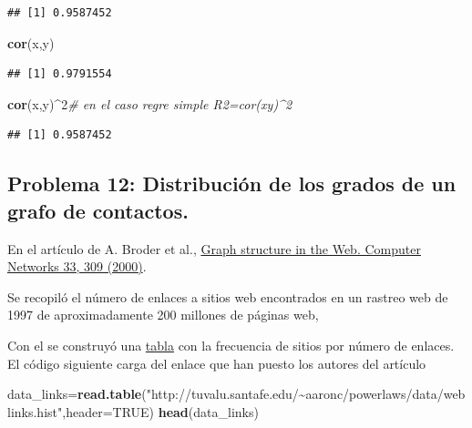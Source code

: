 \documentclass[
]{article}
\newenvironment{Shaded}{\begin{snugshade}}{\end{snugshade}}
\newcommand{\CommentTok}[1]{\textcolor[rgb]{0.56,0.35,0.01}{\textit{#1}}}
\newcommand{\DataTypeTok}[1]{\textcolor[rgb]{0.13,0.29,0.53}{#1}}
\newcommand{\DecValTok}[1]{\textcolor[rgb]{0.00,0.00,0.81}{#1}}
\newcommand{\KeywordTok}[1]{\textcolor[rgb]{0.13,0.29,0.53}{\textbf{#1}}}
\newcommand{\NormalTok}[1]{#1}
\newcommand{\OperatorTok}[1]{\textcolor[rgb]{0.81,0.36,0.00}{\textbf{#1}}}
\newcommand{\OtherTok}[1]{\textcolor[rgb]{0.56,0.35,0.01}{#1}}
\newcommand{\StringTok}[1]{\textcolor[rgb]{0.31,0.60,0.02}{#1}}
\begin{document}
\begin{verbatim}
## [1] 0.9587452
\end{verbatim}

\begin{Shaded}
\begin{Highlighting}[]
\KeywordTok{cor}\NormalTok{(x,y)}
\end{Highlighting}
\end{Shaded}

\begin{verbatim}
## [1] 0.9791554
\end{verbatim}

\begin{Shaded}
\begin{Highlighting}[]
\KeywordTok{cor}\NormalTok{(x,y)}\OperatorTok{\^{}}\DecValTok{2}\CommentTok{\# en el caso regre simp\textasciigrave{}le R2=cor(xy)\^{}2}
\end{Highlighting}
\end{Shaded}

\begin{verbatim}
## [1] 0.9587452
\end{verbatim}

\hypertarget{problema-12-distribuciuxf3n-de-los-grados-de-un-grafo-de-contactos.}{%
\subsection{Problema 12: Distribución de los grados de un grafo de
contactos.}\label{problema-12-distribuciuxf3n-de-los-grados-de-un-grafo-de-contactos.}}

En el artículo de A. Broder et al.,
\href{http://snap.stanford.edu/class/cs224w-readings/broder00bowtie.pdf}{Graph
structure in the Web. Computer Networks 33, 309 (2000)}.

Se recopiló el número de enlaces a sitios web encontrados en un rastreo
web de 1997 de aproximadamente 200 millones de páginas web,

Con el se construyó una
\href{http://tuvalu.santafe.edu/~aaronc/powerlaws/data/weblinks.hist}{tabla}
con la frecuencia de sitios por número de enlaces. El código siguiente
carga del enlace que han puesto los autores del artículo

\begin{Shaded}
\begin{Highlighting}[]
\NormalTok{data\_links=}\KeywordTok{read.table}\NormalTok{(}\StringTok{"http://tuvalu.santafe.edu/\textasciitilde{}aaronc/powerlaws/data/weblinks.hist"}\NormalTok{,}\DataTypeTok{header=}\OtherTok{TRUE}\NormalTok{)}
\KeywordTok{head}\NormalTok{(data\_links)}
\end{Highlighting}
\end{Shaded}
\end{document}
